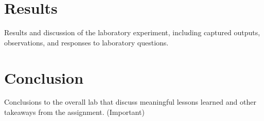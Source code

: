 \documentclass{article}
\begin{document}
\section{Results}
Results and discussion of the laboratory experiment, including captured outputs, observations, and responses to laboratory questions.

\section{Conclusion}
Conclusions to the overall lab that discuss meaningful lessons learned and other takeaways from the assignment. (Important)


\end{document}
